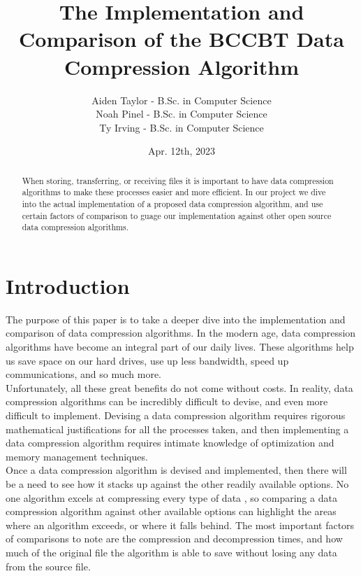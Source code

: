 \documentclass[12pt]{IEEEtran}
\newcommand{\Aiden}{Aiden Taylor - B.Sc. in Computer Science}
\newcommand{\Noah}{Noah Pinel - B.Sc. in Computer Science}
\newcommand{\Ty}{Ty Irving - B.Sc. in Computer Science}
\begin{document}
\title{The Implementation and Comparison of the BCCBT Data Compression Algorithm}
\author{
\begin{tabular}{l}
    \Aiden \\ \Noah\\ \Ty\\ 
\end{tabular}}
\date{Apr. 12th, 2023}

\maketitle

\begin{abstract}
When storing, transferring, or receiving files it is important to have data compression algorithms to make
these processes easier and more efficient. In our project we dive into the actual implementation
of a proposed data compression algorithm, and use certain factors of comparison to guage our implementation
against other open source data compression algorithms.
\end{abstract}

\section{Introduction}
The purpose of this paper is to take a deeper dive into the implementation and comparison of data compression
algorithms. In the modern age, data compression algorithms have become an integral part of our daily lives.
These algorithms help us save space on our hard drives, use up less bandwidth,
speed up communications, and so much more. \\

Unfortunately, all these great benefits do
not come without costs. In reality, data compression algorithms can be incredibly difficult to devise, and even
more difficult to implement. 
Devising a data compression algorithm requires rigorous mathematical justifications for all the processes taken, and
then implementing a data compression algorithm requires intimate knowledge of optimization and memory management
techniques. \\

Once a data compression algorithm is devised and implemented, then there will be a need to see how it
stacks up against the other readily available options. No one algorithm excels at compressing every
type of data \cite{Sjostrand}, so comparing a data compression algorithm against other available options
can highlight the areas where an algorithm exceeds, or where it falls behind. The most important factors 
of comparisons to note are the compression and decompression times, and how much of the original file
the algorithm is able to save without losing any data from the source file.\\
\end{document}
